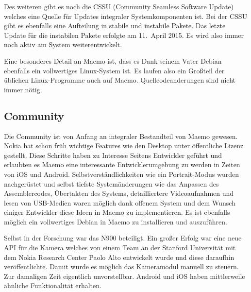 Des weiteren gibt es noch die CSSU\thinspace\cite{online:maemo-cssu} (Community Seamless Software Update) welches eine Quelle für Updates integraler Systemkomponenten ist. Bei der CSSU gibt es ebenfalls eine Aufteilung in stabile und instabile Pakete. Das letzte Update für die instabilen Pakete erfolgte am 11.\ April 2015\thinspace\cite{online:maemo-cssuchangelog}. Es wird also immer noch aktiv am System weiterentwickelt.

Eine besonderes Detail an Maemo ist, dass es Dank seinem Vater Debian ebenfalls ein vollwertiges Linux-System ist. Es laufen also ein Großteil der üblichen Linux-Programme auch auf Maemo. Quellcodeanderungen sind nicht immer nötig.\
\newline

\subsection{Community}
Die Community ist von Anfang an integraler Bestandteil von Maemo gewesen. Nokia hat schon früh wichtige Features wie den Desktop unter öffentliche Lizenz gestellt\thinspace\cite{online:maemo-hildon}. Diese Schritte haben zu Interesse Seitens Entwickler geführt und erlaubten es Maemo eine interessante Entwicklerumgebung zu werden in Zeiten von iOS und Android. Selbstverständlichkeiten wie ein Portrait-Modus wurden nachgerüstet\thinspace\cite{online:maemo-portrait} und selbst tiefste Systemänderungen wie das Anpassen des Assemblercodes\thinspace\cite{online:maemo-thumb}, Übertakten des Systems\thinspace\cite{online:maemo-overclocking}, detailliertere Videoaufnahmen\thinspace\cite{online:maemo-hdvideo} und lesen von USB-Medien\thinspace\cite{online:maemo-usbhost}  waren möglich dank offenem System und dem Wunsch einiger Entwickler diese Ideen in Maemo zu implementieren. Es ist ebenfalls möglich ein vollwertiges Debian in Maemo zu installieren und auszuführen\thinspace\cite{online:maemo-easydebian}\thinspace\cite{online:maemo-easydebianwiki}.

Selbst in der Forschung war das N900 beteiligt. Ein großer Erfolg war eine neue API für die Kamera welches von einem Team an der Stanford Universität mit dem Nokia Research Center Paolo Alto entwickelt wurde und diese daraufhin veröffentlichte\thinspace\cite{online:maemo-fcam}. Damit wurde es möglich das Kameramodul manuell zu steuern. Zur damaligen Zeit eigentlich unvorstellbar. Android und iOS haben mittlerweile ähnliche Funktionalität erhalten\thinspace\cite{online:maemo-fcamlegacy}.

